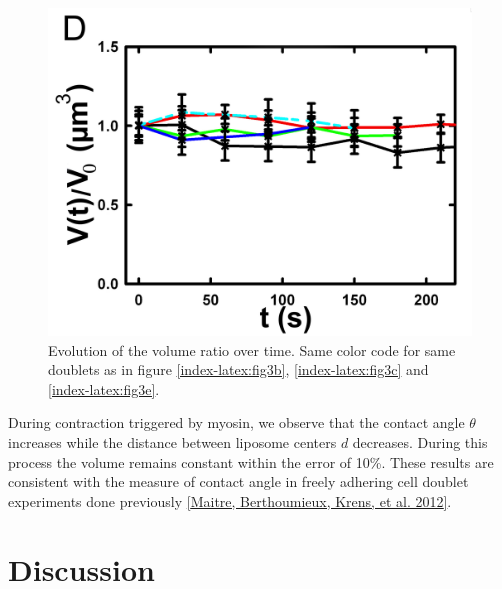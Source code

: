 \documentclass[A4paperpaper,11pt,english]{sphinxmanual}
\begin{document}
\begin{figure}[htbp]
\centering
\capstart

\includegraphics[width=0.500\linewidth]{Fig_03-D.png}
\caption{Evolution of the volume ratio over time.
Same color code for same doublets as in figure \hyperref[index-latex:fig3b]{ \ref*{index-latex:fig3b}}, \hyperref[index-latex:fig3c]{ \ref*{index-latex:fig3c}}
and \hyperref[index-latex:fig3e]{ \ref*{index-latex:fig3e}}.}\label{index-latex:fig3d}\end{figure}

During contraction triggered by myosin, we observe that the contact angle
\(\theta\) increases while the distance between liposome centers \(d\) decreases.
During this process the volume remains constant within the error of 10\%.  These
results are consistent with the measure of contact angle in freely adhering cell
doublet experiments done previously {\hyperref[index-latex:maitre2012]{{[}Maitre, Berthoumieux, Krens,  et al.  2012{]}}}.


\section{Discussion}
\label{index-latex:discussion}
\end{document}
